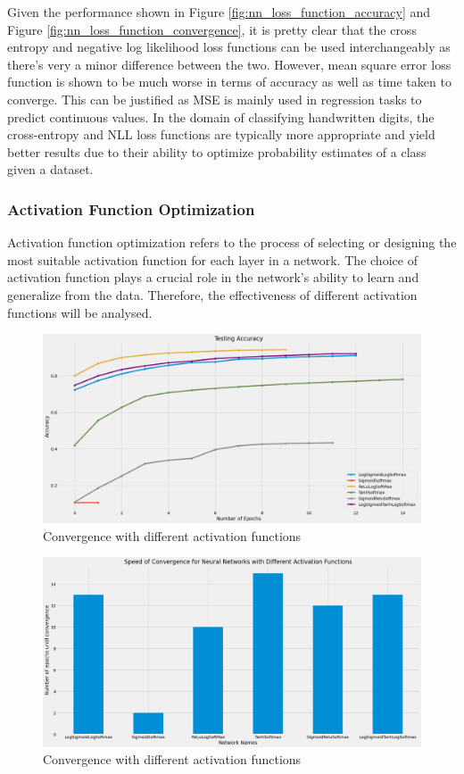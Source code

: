 \documentclass[a4paper,twoside,10pt]{article}
\begin{document}
Given the performance shown in Figure \ref{fig:nn_loss_function_accuracy} and Figure \ref{fig:nn_loss_function_convergence}, it is pretty clear that the cross entropy and negative log likelihood loss functions can be used interchangeably as there's very a minor difference between the two. However, mean square error loss function is shown to be much worse in terms of accuracy as well as time taken to converge. This can be justified as MSE is mainly used in regression tasks to predict continuous values.
In the domain of classifying handwritten digits, the cross-entropy and NLL loss functions are typically more appropriate and yield better results due to their ability to optimize probability estimates of a class given a dataset.

\subsubsection{Activation Function Optimization}
Activation function optimization refers to the process of selecting or designing the most suitable activation function for each layer in a network. The choice of activation function plays a crucial role in the network's ability to learn and generalize from the data. Therefore, the effectiveness of different activation functions will be analysed.

\begin{figure}[H]
    \centering
    \includegraphics[scale=0.3]{Activation Functions Accuracy}
    \caption{Convergence with different activation functions}
    \label{fig:nn_activation_accuracy}
\end{figure}

\begin{figure}[H]
    \centering
    \includegraphics[scale=0.3]{Convergence Activation Functions}
    \caption{Convergence with different activation functions}
    \label{fig:nn_activation_convergence}
\end{figure}
\end{document}
